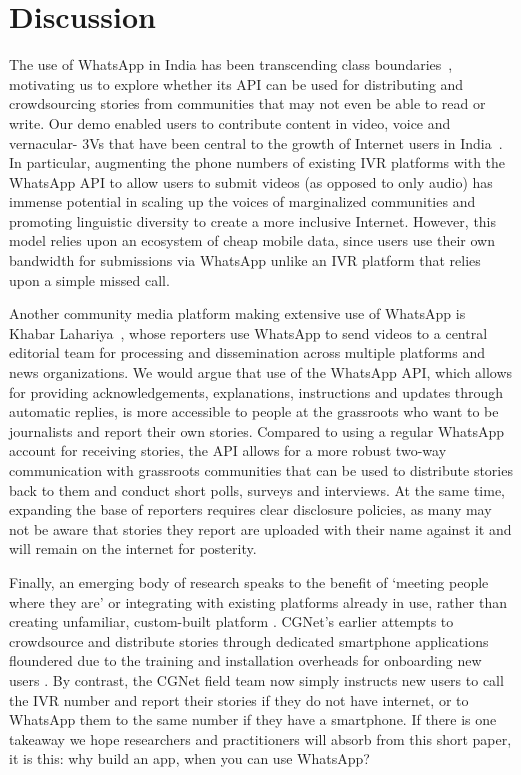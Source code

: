 \section{Discussion}

The use of WhatsApp in India has been transcending class boundaries~\cite{mint_2018_how}, motivating us to explore whether its API can be used for distributing and crowdsourcing stories from communities that may not even be able to read or write. Our demo enabled users to contribute content in video, voice and vernacular- 3Vs that have been central to the growth of Internet users in India~\cite{google_2020_3V}. In particular, augmenting the phone numbers of existing IVR platforms with the WhatsApp API to allow users to submit videos (as opposed to only audio) has immense potential in scaling up the voices of marginalized communities and promoting linguistic diversity to create a more inclusive Internet. However, this model relies upon an ecosystem of cheap  mobile data, since users use their own bandwidth for submissions via WhatsApp unlike an IVR platform that relies upon a simple missed call.

Another community media platform making extensive use of WhatsApp is Khabar Lahariya~\cite{sinha_2018_reimagining}, whose reporters use WhatsApp to send videos to a central editorial team for processing and dissemination across multiple platforms and news organizations. We would argue that use of the WhatsApp API, which allows for providing acknowledgements, explanations, instructions and updates through automatic replies, is more accessible to people at the grassroots who want to be journalists and report their own stories. Compared to using a regular WhatsApp account for receiving stories, the API allows for a more robust two-way communication with grassroots communities that can be used to distribute stories back to them and conduct short polls, surveys and interviews. At the same time, expanding the base of reporters requires clear disclosure policies, as many may not be aware that stories they report are uploaded with their name against it and will remain on the internet for posterity.

Finally, an emerging body of research speaks to the benefit of `meeting people where they are' or integrating with existing platforms already in use, rather than creating unfamiliar, custom-built platform \cite{lambton2020unplatformed, saldivar2019online}. CGNet's earlier attempts to crowdsource and distribute stories through dedicated smartphone applications floundered due to the training and installation overheads for onboarding new users \cite{d2014mobile, mehta2020facilitating}. By contrast, the CGNet field team now simply instructs new users to call the IVR number and report their stories if they do not have internet, or to WhatsApp them to the same number if they have a smartphone. If there is one takeaway we hope researchers and practitioners will absorb from this short paper, it is this: why build an app, when you can use WhatsApp?

